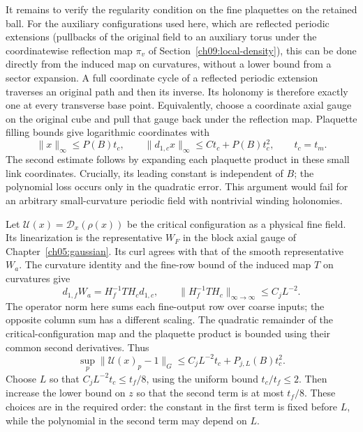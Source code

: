 It remains to verify the regularity condition on the fine plaquettes on the retained ball. For the
auxiliary configurations used here, which are reflected periodic extensions (pullbacks of the original field to an auxiliary torus under the coordinatewise reflection map $\pi_v$ of Section~\ref{ch09:local-density}), this can be done directly
from the induced map on curvatures, without a lower bound from a sector
expansion. A full coordinate cycle of a reflected periodic extension traverses an
original path and then its inverse. Its holonomy is therefore exactly
one at every transverse base point. Equivalently, choose a coordinate
axial gauge on the original cube and pull that gauge back under the
reflection map. Plaquette filling bounds give logarithmic coordinates
with
\[
 \|x\|_\infty\le P(B)t_c,\qquad
 \|d_{1,c}x\|_\infty\le C t_c+P(B)t_c^2,
 \qquad t_c=t_m.
\]
The second estimate follows by expanding each plaquette product in
these small link coordinates. Crucially, its leading constant is
independent of $B$; the polynomial loss occurs only in the quadratic
error. This argument would fail for an arbitrary small-curvature
periodic field with nontrivial winding holonomies.

Let $\mathcal U(x)=\mathcal D_x(\rho(x))$ be the critical configuration as a physical
fine field. Its linearization is the representative $W_F$ in the block axial gauge of
Chapter~\ref{ch05:gaussian}. Its curl agrees with that of the smooth
representative $W_a$. The curvature identity and the
fine-row bound of the induced map $T$ on curvatures give
\[
 d_{1,f}W_a=H_f^{-1}TH_c d_{1,c},\qquad
 \|H_f^{-1}TH_c\|_{\infty\to\infty}\le C_jL^{-2}.
\]
The operator norm here sums each fine-output row over coarse
inputs; the opposite column sum has a different scaling.
The quadratic remainder of the critical-configuration map and the plaquette
product is bounded using their common second derivatives. Thus
\begin{equation}
 \sup_p\|\mathcal U(x)_p-1\|_G
       \le C_jL^{-2}t_c+P_{j,L}(B)t_c^2.
 \label{ch09:stationary-cutoff-margin}
\end{equation}
Choose $L$ so that $C_jL^{-2}t_c\le t_f/8$, using the uniform
bound $t_c/t_f\le2$. Then increase the lower bound on $z$ so that
the second term is at most $t_f/8$. These choices are in the
required order: the constant in the first term is fixed before
$L$, while the polynomial in the second term may depend on $L$.

